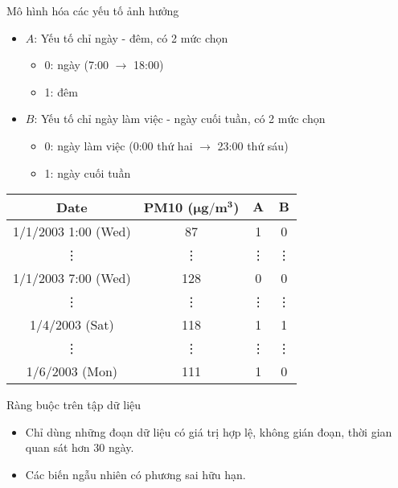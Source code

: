 \documentclass{beamer}
\begin{document}
\begin{frame}{Mô hình hóa các yếu tố ảnh hưởng}
\begin{itemize}
\item \(A\): Yếu tố chỉ ngày - đêm, có 2 mức chọn
	\begin{itemize}
	\item 0: ngày (7:00 \(\to\) 18:00)
	\item 1: đêm
	\end{itemize}
\item \(B\): Yếu tố chỉ ngày làm việc - ngày cuối tuần, có 2 mức chọn
	\begin{itemize}
	\item 0: ngày làm việc (0:00 thứ hai \(\to\) 23:00 thứ sáu)
	\item 1: ngày cuối tuần
	\end{itemize}
\end{itemize}
\begin{table}
\centering

\begin{tabular}{|c|c|c|c|}
\hline
\textbf{Date} & \textbf{PM10 (\(\boldsymbol{\mu}\mathbf{g/m^3}\))} & \(\mathbf{A}\) & \(\mathbf{B}\) \\ \hline
1/1/2003 1:00 (Wed) & 87 & 1 & 0 \\ \hline
\vdots & \vdots & \vdots & \vdots \\ \hline
1/1/2003 7:00 (Wed) & 128 & 0 & 0 \\ \hline
\vdots & \vdots & \vdots & \vdots \\ \hline
1/4/2003 (Sat) & 118 & 1 & 1 \\ \hline
\vdots & \vdots & \vdots & \vdots \\ \hline
1/6/2003 (Mon) & 111 & 1 & 0 \\
\hline
\end{tabular}
\end{table}
\end{frame}

\begin{frame}{Ràng buộc trên tập dữ liệu}
\begin{itemize}
\item Chỉ dùng những đoạn dữ liệu có giá trị hợp lệ,
 không gián đoạn, thời gian quan sát hơn 30 ngày.
\item Các biến ngẫu nhiên có phương sai hữu hạn.
\end{itemize}
\end{frame}
\end{document}
